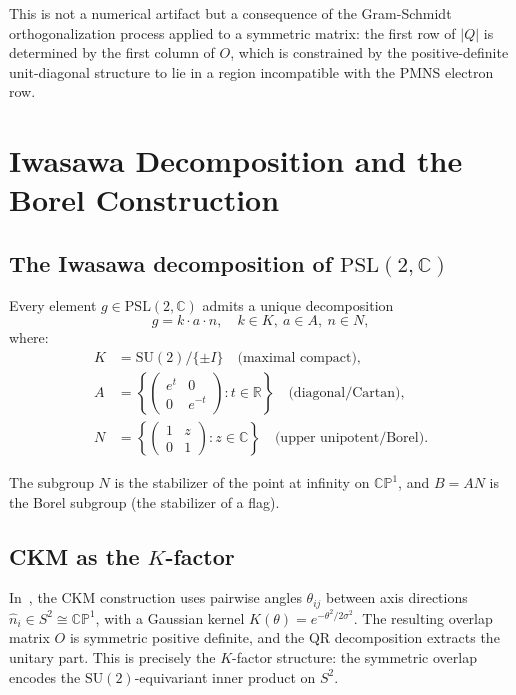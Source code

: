 \documentclass[floatfix,aps,prd,twocolumn,showpacs,superscriptaddress,longbibliography]{revtex4-2}
\newcommand{\PSL}{\mathrm{PSL}(2,\mathbb{C})}
\newcommand{\SUtwo}{\mathrm{SU}(2)}
\newcommand{\CP}{\mathbb{CP}^1}
\begin{document}
This is not a numerical artifact but a consequence of the Gram-Schmidt
orthogonalization process applied to a symmetric matrix: the first row
of $|Q|$ is determined by the first column of $O$, which is constrained
by the positive-definite unit-diagonal structure to lie in a region
incompatible with the PMNS electron row.

\section{Iwasawa Decomposition and the Borel Construction}
\label{sec:iwasawa}

\subsection{The Iwasawa decomposition of $\PSL$}

Every element $g \in \PSL$ admits a unique decomposition
\begin{equation}
  g = k \cdot a \cdot n, \quad k \in K,\ a \in A,\ n \in N,
  \label{eq:iwasawa}
\end{equation}
where:
\begin{align}
  K &= \SUtwo / \{\pm I\} \quad \text{(maximal compact)}, \\
  A &= \left\{ \begin{pmatrix} e^t & 0 \\ 0 & e^{-t} \end{pmatrix} : t \in \mathbb{R} \right\}
      \quad \text{(diagonal/Cartan)}, \\
  N &= \left\{ \begin{pmatrix} 1 & z \\ 0 & 1 \end{pmatrix} : z \in \mathbb{C} \right\}
      \quad \text{(upper unipotent/Borel)}.
\end{align}

The subgroup $N$ is the stabilizer of the point at infinity on $\CP$,
and $B = AN$ is the Borel subgroup (the stabilizer of a flag).

\subsection{CKM as the $K$-factor}

In~\cite{Gentry:CKM}, the CKM construction uses pairwise angles
$\theta_{ij}$ between axis directions $\hat{n}_i \in S^2 \cong \CP$,
with a Gaussian kernel $K(\theta) = e^{-\theta^2/2\sigma^2}$.
The resulting overlap matrix $O$ is symmetric positive definite,
and the QR decomposition extracts the unitary part. This is precisely
the $K$-factor structure: the symmetric overlap encodes the
$\SUtwo$-equivariant inner product on $S^2$.
\end{document}
